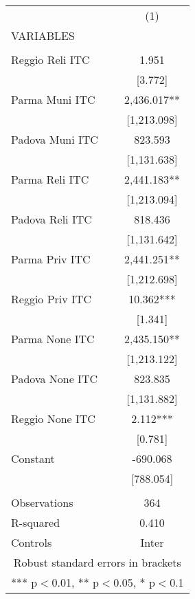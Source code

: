 \begin{tabular}{lc} \hline
 & (1) \\
VARIABLES &  \\ \hline
 &  \\
Reggio Reli ITC & 1.951 \\
 & [3.772] \\
Parma Muni ITC & 2,436.017** \\
 & [1,213.098] \\
Padova Muni ITC & 823.593 \\
 & [1,131.638] \\
Parma Reli ITC & 2,441.183** \\
 & [1,213.094] \\
Padova Reli ITC & 818.436 \\
 & [1,131.642] \\
Parma Priv ITC & 2,441.251** \\
 & [1,212.698] \\
Reggio Priv ITC & 10.362*** \\
 & [1.341] \\
Parma None ITC & 2,435.150** \\
 & [1,213.122] \\
Padova None ITC & 823.835 \\
 & [1,131.882] \\
Reggio None ITC & 2.112*** \\
 & [0.781] \\
Constant & -690.068 \\
 & [788.054] \\
 &  \\
Observations & 364 \\
R-squared & 0.410 \\
 Controls & Inter \\ \hline
\multicolumn{2}{c}{ Robust standard errors in brackets} \\
\multicolumn{2}{c}{ *** p$<$0.01, ** p$<$0.05, * p$<$0.1} \\
\end{tabular}
